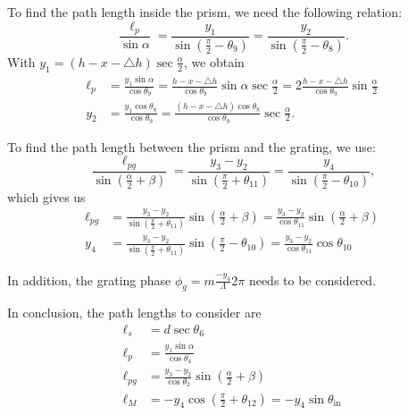 \documentclass[12pt,hidelinks]{book}
\begin{document}
To find the path length inside the prism, we need the following relation:
\begin{equation}
\frac{\ell_p}{\sin\alpha}=\frac{y_1}{\sin\left(\frac{\pi}{2}-\theta_9\right)}=\frac{y_2}{\sin\left(\frac{\pi}{2}-\theta_8\right)}.
\end{equation}
With $y_1=\left(h-x-\triangle h\right)\sec\frac{\alpha}{2}$, we obtain 
\begin{subequations}
\begin{align}
\ell_p & =\frac{y_1\sin\alpha}{\cos\theta_9}=\frac{h-x-\triangle h}{\cos\theta_9}\sin\alpha\sec\frac{\alpha}{2}=2\frac{h-x-\triangle h}{\cos\theta_9}\sin\frac{\alpha}{2} \\
y_2 & =\frac{y_1\cos\theta_8}{\cos\theta_9}=\frac{\left(h-x-\triangle h\right)\cos\theta_8}{\cos\theta_9}\sec\frac{\alpha}{2}.
\end{align}
\end{subequations}

To find the path length between the prism and the grating, we use:
\begin{equation}
\frac{\ell_{pg}}{\sin(\frac{\alpha}{2}+\beta)}=\frac{y_3-y_2}{\sin(\frac{\pi}{2}+\theta_{11})}=\frac{y_4}{\sin(\frac{\pi}{2}-\theta_{10})},
\end{equation}
which gives us
\begin{subequations}
\begin{align}
\ell_{pg} & =\frac{y_3-y_2}{\sin(\frac{\pi}{2}+\theta_{11})}\sin(\frac{\alpha}{2}+\beta)=\frac{y_3-y_2}{\cos\theta_{11}}\sin(\frac{\alpha}{2}+\beta) \\
y_4 & =\frac{y_3-y_2}{\sin(\frac{\pi}{2}+\theta_{11})}\sin(\frac{\pi}{2}-\theta_{10})=\frac{y_3-y_2}{\cos\theta_{11}}\cos\theta_{10}
\end{align}
\end{subequations}

In addition, the grating phase $\displaystyle \phi_g=m\frac{-y_4}{\Lambda}2\pi$ needs to be considered.

In conclusion, the path lengths to consider are
\begin{subequations}
\begin{align}
\ell_s & =d\sec\theta_6 \\
\ell_p & =\frac{y_1\sin\alpha}{\cos\theta_4} \\
\ell_{pg} & =\frac{y_3-y_2}{\cos\theta_2}\sin(\frac{\alpha}{2}+\beta) \\
\ell_M & =-y_4\cos(\frac{\pi}{2}+\theta_{12})=-y_4\sin\theta_{\text{in}}
\end{align}
\end{subequations}
\end{document}
